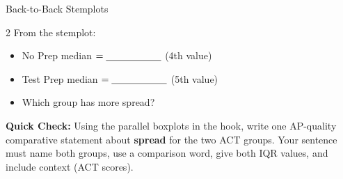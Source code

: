 \documentclass[10pt]{article}
\begin{document}
\begin{notesbox}{Back-to-Back Stemplots}
\begin{multicols}{2}
\vspace{4pt}
From the stemplot:
\begin{itemize}[itemsep=2pt]
  \item No Prep median $= \blank{2cm}$ (4th value)
  \item Test Prep median $= \blank{2cm}$ (5th value)
  \item Which group has more spread? \blank{3cm}
\end{itemize}

\end{multicols}
\end{notesbox}

\vspace{0.08in}

\begin{tcolorbox}[colback=goldbg, colframe=goldacc, boxrule=0.8pt, arc=2mm,
    left=4mm, right=4mm, top=2mm, bottom=2mm]
\small\textbf{Quick Check:} Using the parallel boxplots in the hook, write one
AP-quality comparative statement about \textbf{spread} for the two ACT groups.
Your sentence must name both groups, use a comparison word, give both IQR
values, and include context (ACT scores).\\[8pt]
\writeline\\[1pt]\writeline
\end{tcolorbox}
\end{document}
